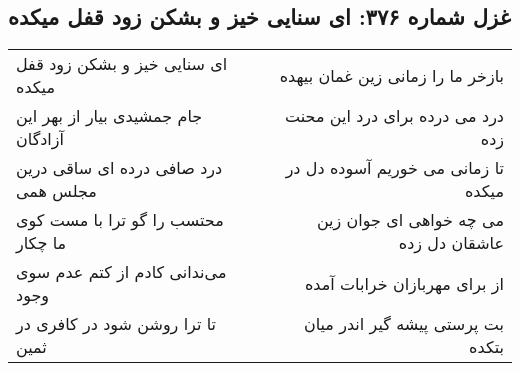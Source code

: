 \begin{center}
\section*{غزل شماره ۳۷۶: ای سنایی خیز و بشکن زود قفل میکده}
\label{sec:376}
\begin{longtable}{l p{0.5cm} r}
ای سنایی خیز و بشکن زود قفل میکده
&&
بازخر ما را زمانی زین غمان بیهده
\\
جام جمشیدی بیار از بهر این آزادگان
&&
درد می درده برای درد این محنت زده
\\
درد صافی درده ای ساقی درین مجلس همی
&&
تا زمانی می خوریم آسوده دل در میکده
\\
محتسب را گو ترا با مست کوی ما چکار
&&
می چه خواهی ای جوان زین عاشقان دل زده
\\
می‌ندانی کادم از کتم عدم سوی وجود
&&
از برای مهربازان خرابات آمده
\\
تا ترا روشن شود در کافری در ثمین
&&
بت پرستی پیشه گیر اندر میان بتکده
\\
\end{longtable}
\end{center}
